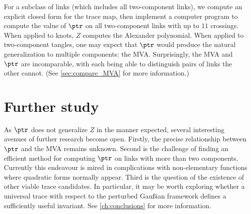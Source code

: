 For a subclass of links (which includes all two-component links), we compute an
explicit closed form for the trace map, then implement a computer program to
compute the value of $\ptr$ on all two-component links with up to $11$
crossings. When applied to knots, $Z$ computes the Alexander
polynomial. When applied to two-component
tangles, one may expect that $\ptr$ would produce the natural generalization to
multiple components: the \ac{MVA}. Surprisingly, the \ac{MVA} and $\ptr$ are
incomparable, with each being able to distinguish pairs of links the other
cannot. (See \cref{sec:compare_MVA} for more information.)

\section{Further study}
As $\ptr$ does not generalize $Z$ in the manner expected, several interesting
avenues of further research become open. Firstly, the precise relationship
between $\ptr$ and the \ac{MVA} remains unknown. Second is the challenge of
finding an efficient method for computing $\ptr$ on links with more than two
components. Currently this endeavour is mired in complications with
non-elementary functions where quadratic forms normally appear. Third is the
question of the existence of other viable trace candidates. In particular, it
may be worth exploring whether a universal trace with respect to the perturbed
Gaußian framework defines a sufficiently useful invariant. See
\cref{ch:conclusions} for more information.
